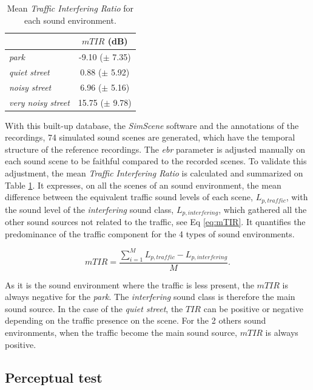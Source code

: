 \documentclass[review,5p,twocolumn,sort&compress,times]{elsarticle}
\begin{document}
\begin{table}[t]
\centering
\caption{Mean \textit{Traffic Interfering Ratio} for each sound environment.}
\begin{tabular}{lc}
 & $mTIR$ (dB)\\ \hline
 \textit{park} & -9.10 ($\pm$ 7.35) \\
 \textit{quiet street} & 0.88 ($\pm$ 5.92) \\
 \textit{noisy street} & 6.96 ($\pm$ 5.16) \\
 \textit{very noisy street} & 15.75 ($\pm$ 9.78) \\ \hline
\end{tabular}
\label{tab:mTIR}
\end{table}

With this built-up database, the \textit{SimScene} software and the annotations of the recordings, 74 simulated sound scenes are generated, which have the temporal structure of the reference recordings. The \textit{ebr} parameter is adjusted manually on each sound scene to be faithful compared to the recorded scenes. To validate this adjustment, the mean \textit{Traffic Interfering Ratio} is calculated and summarized on Table \ref{tab:mTIR}. It expresses, on all the scenes of an sound environment, the mean difference between the equivalent traffic sound levels of each scene, $L_{p,traffic}$, with the sound level of the \textit{interfering} sound class, $L_{p, interfering}$, which gathered all the other sound sources not related to the traffic, see Eq \ref{eq:mTIR}. It quantifies the predominance of the traffic component for the 4 types of sound environments.

\begin{equation}\label{eq:mTIR}
mTIR = \frac{\sum_{i = 1}^M L_{p,traffic} - L_{p, interfering}}{M}.
\end{equation}

As it is the sound environment where the traffic is less present, the $mTIR$ is always negative for the \textit{park}. The \textit{interfering} sound class is therefore the main sound source. In the case of the \textit{quiet street}, the $TIR$ can be positive or negative depending on the traffic presence on the scene. For the 2 others sound environments, when the traffic become the main sound source, $mTIR$ is always positive.

\subsection{Perceptual test}
\end{document}
